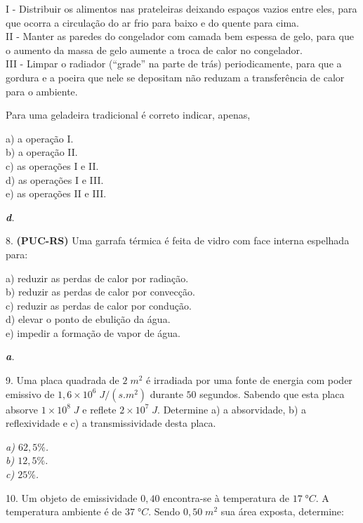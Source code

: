 \documentclass[12pt,twoside]{article}
\newenvironment{resposta*}
{\bf Resposta:\\ }
{}
\begin{document}
I - Distribuir os alimentos nas prateleiras deixando espaços vazios entre eles, para que ocorra a circulação do ar frio para baixo e do quente para cima. \\
II - Manter as paredes do congelador com camada bem espessa de gelo, para que o aumento da massa de gelo aumente a troca de calor no congelador. \\
III - Limpar o radiador (“grade” na parte de trás) periodicamente, para que a gordura e a poeira que nele se depositam não reduzam a transferência de calor para o ambiente.


Para uma geladeira tradicional é correto indicar, apenas,


a) a operação I. \\
b) a operação II. \\
c) as operações I e II. \\
d) as operações I e III. \\
e) as operações II e III.


\begin{resposta*}
{\it \textbf{d}.}
\end{resposta*}

8. \textbf{(PUC-RS)} Uma garrafa térmica é feita de vidro com face interna espelhada para:


a) reduzir as perdas de calor por radiação. \\
b) reduzir as perdas de calor por convecção. \\
c) reduzir as perdas de calor por condução. \\
d) elevar o ponto de ebulição da água. \\
e) impedir a formação de vapor de água.


\begin{resposta*}
{\it \textbf{a}.}
\end{resposta*}

9. Uma placa quadrada de $2\;m^{2}$ é irradiada por uma fonte de energia com poder emissivo de $1,6\times 10^{6}\;J/(s.m^{2})$ durante $50$ segundos. Sabendo que esta placa absorve $1\times 10^{8}\;J$ e reflete $2\times 10^{7}\;J$. Determine a) a absorvidade, b) a reflexividade e c) a transmissividade desta placa.


\begin{resposta*}
{\it a) $62,5\%$. \\
b) $12,5\%$. \\
c) $25\%$.}
\end{resposta*}

10. Um objeto de emissividade $0,40$ encontra-se à temperatura de $17\;°C$. A temperatura ambiente é de $37\;°C$. Sendo $0,50\;m^{2}$ sua área exposta, determine:
\end{document}
